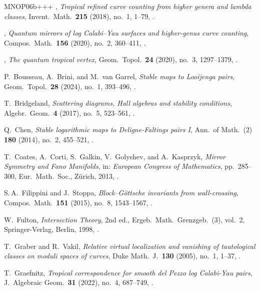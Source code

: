 \begin{thebibliography}{MNOP06b+++}
\bysame, \emph{Tropical refined curve counting from higher genera and
  lambda classes}, Invent.\ Math.\ \textbf{215} (2018), no.~1, 
1--79,
  .

\bysame, \emph{Quantum mirrors of log {C}alabi--{Y}au surfaces and higher-genus
  curve counting}, Compos.\ Math.\ \textbf{156} (2020), no.~2, 
360--411,
  .

\bysame, \emph{The quantum tropical vertex}, Geom.\ Topol.\ \textbf{24} (2020),
  no.~3, 
1297--1379, .

P.~Bousseau, A.~Brini, and M.~van Garrel, \emph{Stable maps to Looijenga
  pairs}, Geom.\ Topol.\ \textbf{28} (2024), no.~1, 
393--496,  .

T.~Bridgeland, \emph{Scattering diagrams, {H}all algebras and stability
  conditions}, Algebr.\ Geom.\ \textbf{4} (2017), no.~5, 523--561,
  .

Q.~Chen, \emph{Stable logarithmic maps to {D}eligne-{F}altings pairs {I}}, Ann.\
  of Math.~(2) \textbf{180} (2014), no.~2, 455--521,
  .

T.~Coates, A.~Corti, S.~Galkin, V.~Golyshev, and A.~Kasprzyk, \emph{Mirror
  Symmetry and Fano Manifolds}, in: \emph{European {C}ongress of {M}athematics}, pp.~285--300, Eur.\ Math.\ Soc., Z\"{u}rich, 2013, .

S.\,A.~Filippini and J.~Stoppa, \emph{Block--{G}\"{o}ttsche invariants from
  wall-crossing}, Compos.\ Math.\ \textbf{151} (2015), no.~8, 
1543--1567,  .

  W.~Fulton, \emph{Intersection Theory}, 2nd ed., 
  Ergeb.\ Math.\ Grenzgeb.~(3), vol.~2, 
  Springer-Verlag, Berlin, 
  1998, .

T.~Graber and R.~Vakil, \emph{Relative virtual localization and vanishing of
  tautological classes on moduli spaces of curves}, Duke Math.~J.\ \textbf{130}
  (2005), no.~1, 1--37, \doi{10.1215/S0012-7094-05-13011-3}.

T.~Graefnitz, \emph{Tropical correspondence for smooth del Pezzo log
  Calabi-Yau pairs}, J.~Algebraic Geom.\ \textbf{31} (2022), no.~4,
  687--749, \doi{10.1090/jag/794}.


\end{thebibliography}
